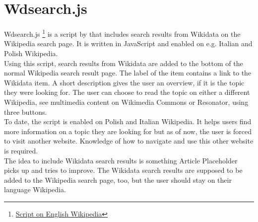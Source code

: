 \section{Wdsearch.js}
Wdsearch.js \footnote{\href{https://en.wikipedia.org/w/index.php?title=MediaWiki:Wdsearch.js&action=raw&ctype=text/javascript}{Script on English Wikipedia}} is a script by  that includes search results from Wikidata on the Wikipedia search page. It is written in JavaScript and enabled on e.g. Italian and Polish Wikipedia. \\
Using this script, search results from Wikidata are added to the bottom of the normal Wikipedia search result page. The label of the item  contains a link to the Wikidata item. A short description gives the user an overview, if it is the topic they were looking for. The user can choose to read the topic on either a different Wikipedia, see multimedia content on Wikimedia Commons or Resonator, using three buttons. \\
To date, the script is enabled on Polish and Italian Wikipedia. It helps users find more information on a topic they are looking for but as of now, the user is forced to visit another website. Knowledge of how to navigate and use this other website is required. \\
The idea to include Wikidata search results is something Article Placeholder picks up and tries to improve. The Wikidata search results are supposed to be added to the Wikipedia search page, too, but the user should stay on their language Wikipedia.